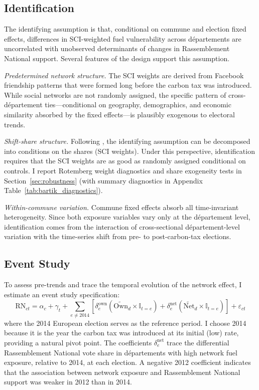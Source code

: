 \documentclass[12pt]{article}
\newcommand{\ind}{\mathbb{I}}
\newcommand{\rn}{Rassemblement National}
\newcommand{\dept}{d\'{e}partement}
\newcommand{\depts}{d\'{e}partements}
\begin{document}
\subsection{Identification}

The identifying assumption is that, conditional on commune and election fixed effects, differences in SCI-weighted fuel vulnerability across \depts{} are uncorrelated with unobserved determinants of changes in \rn{} support. Several features of the design support this assumption.

\textit{Predetermined network structure.} The SCI weights are derived from Facebook friendship patterns that were formed long before the carbon tax was introduced. While social networks are not randomly assigned, the specific pattern of cross-\dept{} ties---conditional on geography, demographics, and economic similarity absorbed by the fixed effects---is plausibly exogenous to electoral trends.

\textit{Shift-share structure.} Following \citet{goldsmith2020bartik}, the identifying assumption can be decomposed into conditions on the shares (SCI weights). Under this perspective, identification requires that the SCI weights are as good as randomly assigned conditional on controls. I report Rotemberg weight diagnostics and share exogeneity tests in Section~\ref{sec:robustness} (with summary diagnostics in Appendix Table~\ref{tab:bartik_diagnostics}).

\textit{Within-commune variation.} Commune fixed effects absorb all time-invariant heterogeneity. Since both exposure variables vary only at the \dept{} level, identification comes from the interaction of cross-sectional \dept{}-level variation with the time-series shift from pre- to post-carbon-tax elections.

\subsection{Event Study}

To assess pre-trends and trace the temporal evolution of the network effect, I estimate an event study specification:
\begin{equation}
\text{RN}_{ct} = \alpha_c + \gamma_t + \sum_{e \neq 2014} \left[ \delta_e^{\text{own}} \left(\widetilde{\text{Own}}_d \times \ind_{t=e}\right) + \delta_e^{\text{net}} \left(\widetilde{\text{Net}}_d \times \ind_{t=e}\right) \right] + \varepsilon_{ct}
\label{eq:event_study}
\end{equation}
where the 2014 European election serves as the reference period. I choose 2014 because it is the year the carbon tax was introduced at its initial (low) rate, providing a natural pivot point. The coefficients $\delta_e^{\text{net}}$ trace the differential \rn{} vote share in \depts{} with high network fuel exposure, relative to 2014, at each election. A negative 2012 coefficient indicates that the association between network exposure and \rn{} support was weaker in 2012 than in 2014.
\end{document}
